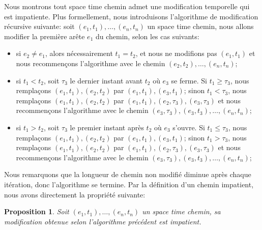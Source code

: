 \documentclass[titlepage,a4paper,12pt]{article}
\newcounter{thm}
\newcounter{prop}
\newtheorem{modifimp}[prop]{Proposition}
\begin{document}
Nous montrons tout space time chemin admet une modification temporelle qui est impatiente. Plus formellement, nous introduisons l'algorithme de modification récursive suivante: soit $(e_1,t_1),\dots,(e_n,t_n)$ un space time chemin, nous allons modifier la première arête $e_1$ du chemin, selon les cas suivants:
\begin{itemize}[label = $\bullet$, leftmargin = *]
\item si $e_2 \neq e_1$, alors nécessairement $t_1 = t_2$, et nous ne modifions pas $(e_1,t_1)$ et nous recommençons l'algorithme avec le chemin $(e_2,t_2),\dots,(e_n,t_n)$;
\item  si $t_1< t_2$, soit $\tau_3$ le dernier instant avant $t_2$ où $e_{3}$ se ferme. Si $t_1 \geqslant \tau_3$, nous remplaçons $(e_1,t_1),(e_2,t_2)$ par $(e_1,t_1),(e_3,t_1)$; sinon $t_1 < \tau_3$, nous remplaçons $(e_1,t_1),(e_2,t_2)$ par $(e_1,t_1),(e_2,\tau_3),(e_3,\tau_3)$ et nous recommençons l'algorithme avec le chemin $(e_3,\tau_3),(e_3,t_3),\dots,(e_n,t_n)$;
\item si $t_1 > t_2$, soit $\tau_3$ le premier instant après $t_2$ où $e_{3}$ s'ouvre. Si $t_1 \leqslant \tau_3$, nous remplaçons $(e_1,t_1),(e_2,t_2)$ par $(e_1,t_1),(e_3,t_1)$; sinon $t_1 > \tau_3$, nous remplaçons $(e_1,t_1),(e_2,t_2)$ par $(e_1,t_1),(e_2,\tau_3),(e_3,\tau_3)$ et nous recommençons l'algorithme avec le chemin $(e_3,\tau_3),(e_3,t_3),\dots,(e_n,t_n)$;
\end{itemize}
Nous remarquons que la longueur de chemin non modifié diminue après chaque itération, donc l'algorithme se termine. Par la définition d'un chemin impatient, nous avons directement la propriété suivante:
\begin{modifimp}
Soit $(e_1,t_1),\dots,(e_n,t_n)$ un space time chemin, sa modification obtenue selon l'algorithme précédent est impatient.
\end{modifimp}
\end{document}

